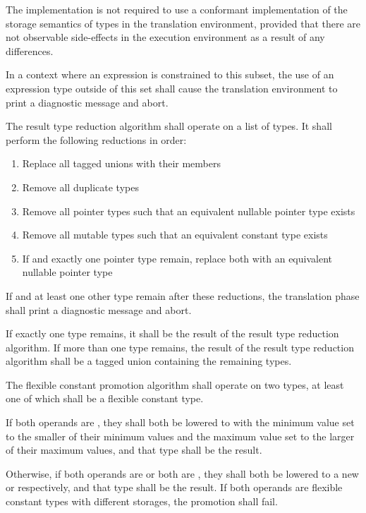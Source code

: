 \specsubitem
The implementation is not required to use a conformant implementation of the
storage semantics of types in the translation environment, provided that there
are not observable side-effects in the execution environment as a result of any
differences.

\specsubitem
In a context where an expression is constrained to this subset, the use of an
expression type outside of this set shall cause the translation environment to
print a diagnostic message and abort.


\specsubitem
The result type reduction algorithm shall operate on a list of types. It shall
perform the following reductions in order:

\begin{enumerate}
\item Replace all tagged unions with their members
\item Remove all duplicate types
\item Remove all pointer types such that an equivalent nullable pointer type
	exists
\item Remove all mutable types such that an equivalent constant type exists
\item If  and exactly one pointer type remain, replace both with
	an equivalent nullable pointer type
\end{enumerate}

\specsubitem
If  and at least one other type remain after these reductions,
the translation phase shall print a diagnostic message and abort.

\specsubitem
If exactly one type remains, it shall be the result of the result type reduction
algorithm. If more than one type remains, the result of the result type
reduction algorithm shall be a tagged union containing the remaining types.


\specsubitem
The flexible constant promotion algorithm shall operate on two types, at least
one of which shall be a flexible constant type.

\specsubitem
If both operands are , they shall both be lowered to
 with the minimum value set to the smaller of their
minimum values and the maximum value set to the larger of their maximum values,
and that type shall be the result.

\specsubitem
Otherwise, if both operands are  or both are ,
they shall both be lowered to a new  or 
respectively, and that type shall be the result. If both operands are flexible
constant types with different storages, the promotion shall fail.

